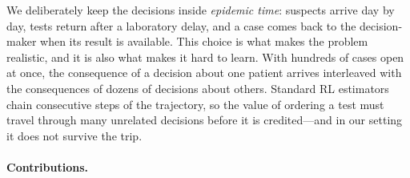\documentclass[11pt,a4paper]{article}
\begin{document}
We deliberately keep the decisions inside \emph{epidemic time}: suspects arrive day by day, tests return after a laboratory delay, and a case comes back to the decision-maker when its result is available. This choice is what makes the problem realistic, and it is also what makes it hard to learn. With hundreds of cases open at once, the consequence of a decision about one patient arrives interleaved with the consequences of dozens of decisions about others. Standard RL estimators chain consecutive steps of the trajectory, so the value of ordering a test must travel through many unrelated decisions before it is credited---and in our setting it does not survive the trip.

\paragraph{Contributions.}
\end{document}
